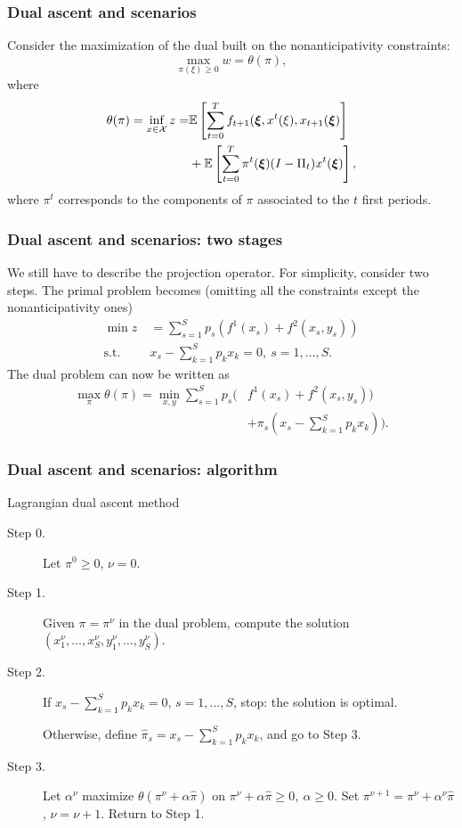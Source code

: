 \documentclass{beamer}
\begin{document}
\begin{frame}
\frametitle{Dual ascent and scenarios}

Consider the maximization of the dual built on the nonanticipativity constraints:
\[
\max_{\pi(\xi) \geq 0} w = \theta(\pi),
\]
where
\begin{align*}
\theta(\pi) = \inf_{x \in \mathcal{X}} z = & 
{\mathbb{E}}\left[\sum_{t = 0}^T f_{t+1} ({\boldsymbol{\xi}}, x^t(\xi), x_{t+1}({\boldsymbol{\xi}}) \right] \\
& + {\mathbb{E}}\left[\sum_{t = 0}^T \pi^t({\boldsymbol{\xi}})(I-\Pi_t)x^t({\boldsymbol{\xi}}) \right],
\end{align*}
where $\pi^t$ corresponds to the components of $\pi$ associated to the $t$ first periods.

\end{frame}

\begin{frame}
\frametitle{Dual ascent and scenarios: two stages}

We still have to describe the projection operator.
For simplicity, consider two steps.
The primal problem becomes (omitting all the constraints except the nonanticipativity ones)
\begin{align*}
\min z\ & = \sum_{s = 1}^S p_s \left( f^1(x_s)+f^2(x_s, y_s) \right) \\
\mbox{s.t. } & x_s - \sum_{k=1}^S p_k x_k = 0,\ s=1,\ldots,S. 
\end{align*}
The dual problem can now be written as
\begin{align*}
\max_{\pi} \theta(\pi) = \min_{x,y} \sum_{s=1}^S p_s\Biggl(& f^1(x_s)+f^2(x_s,
y_s))\\
& + \pi_s\left( x_s - \sum_{k=1}^S p_kx_k \right) \Biggr).
\end{align*}

\end{frame}

\begin{frame}
\frametitle{Dual ascent and scenarios: algorithm}

\begin{algo}{Lagrangian dual ascent method}
\begin{description}
\item[Step 0.] Let $\pi^0 \geq 0$, $\nu = 0$.
\item[Step 1.]
Given $\pi = \pi^{\nu}$ in the dual problem, compute the solution
$(x^{\nu}_1, \ldots, x^{\nu}_S, y_1^{\nu},\ldots{},y_S^{\nu})$.
\item[Step 2.]
If $x_s - \sum_{k = 1}^S p_kx_k = 0$, $s = 1,\ldots,S$, stop: the solution is optimal.

Otherwise, define $\hat{\pi}_s = x_s - \sum_{k=1}^S p_kx_k$, and go to Step 3.
\item[Step 3.]
Let $\alpha^\nu$ maximize $\theta(\pi^{\nu}+\alpha\hat{\pi})$ on
$\pi^{\nu}+\alpha\hat{\pi} \geq 0,\ \alpha \geq 0$.
Set $\pi^{\nu+1} = \pi^{\nu} + \alpha^{\nu}\hat{\pi}$, $\nu = \nu+1$. Return to Step 1.
\end{description}
\end{algo}

\end{frame}
\end{document}
